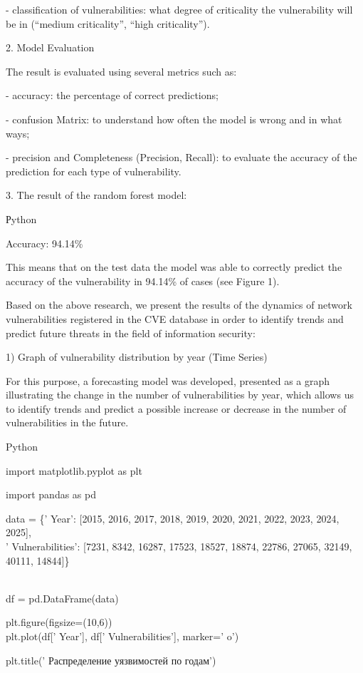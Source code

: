 - classification of vulnerabilities: what degree of criticality the
vulnerability will be in (``medium criticality'', ``high criticality'').

2. Model Evaluation

The result is evaluated using several metrics such as:

- accuracy: the percentage of correct predictions;

- confusion Matrix: to understand how often the model is wrong and in
what ways;

- precision and Completeness (Precision, Recall): to evaluate the
accuracy of the prediction for each type of vulnerability.

3. The result of the random forest model:

Рython

Accuracy: 94.14\%

This means that on the test data the model was able to correctly predict
the accuracy of the vulnerability in 94.14\% of cases (see Figure 1).

Based on the above research, we present the results of the dynamics of
network vulnerabilities registered in the CVE database in order to
identify trends and predict future threats in the field of information
security:

1) Graph of vulnerability distribution by year (Time Series)

For this purpose, a forecasting model was developed, presented as a
graph illustrating the change in the number of vulnerabilities by year,
which allows us to identify trends and predict a possible increase or
decrease in the number of vulnerabilities in the future.

Python

import matplotlib.pyplot as plt

import pandas as pd

data = \{' Year': {[}2015, 2016, 2017,
2018, 2019, 2020, 2021, 2022, 2023, 2024, 2025{]},\\
' Vulnerabilities': {[}7231, 8342, 16287,
17523, 18527, 18874, 22786, 27065, 32149, 40111, 14844{]}\}\\
\strut \\
df = pd.DataFrame(data)

plt.figure(figsize=(10,6))\\
plt.plot(df{[}' Year'{]},
df{[}' Vulnerabilities'{]},
marker=' o')

plt.title(' Распределение уязвимостей по
годам')

